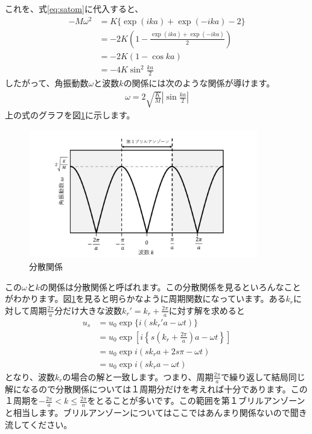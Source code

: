 \documentclass[10pt,b5paper,papersize,dvipdfmx]{jsbook}
\begin{document}
これを、式\ref{eq:satom}に代入すると、
\begin{align}
  -M\omega^2 &= K\{\exp(ika) + \exp(-ika) - 2\} \\
             &= -2K\left(1-\frac{\exp(ika) + \exp(-ika)}{2}\right) \\
             &= -2K(1-\cos ka)\\
             &= -4K\sin^2\frac{ka}{2}
\end{align}
したがって、角振動数$\omega$と波数$k$の関係には次のような関係が導けます。
\begin{align}
  \omega = 2 \sqrt{\frac{K}{M}} \left| \sin \frac{ka}{2}\right|
\end{align}
上の式のグラフを図\ref{fig:bunnsan}に示します。
\begin{figure}[htbp]
  \centering
  \includegraphics[width=10cm]{img/bunsann.pdf}  %
  \caption{分散関係}
  \label{fig:bunnsan}
\end{figure}
この$\omega$と$k$の関係は分散関係と呼ばれます。この分散関係を見るといろんなことがわかります。図\ref{fig:bunnsan}を見ると明らかなように周期関数になっています。ある$k_r$に対して周期$\frac{2\pi}{a}$分だけ大きな波数$k_r' = k_r + \frac{2\pi}{a}$に対す解を求めると
\begin{align}
  u_s &= u_0 \exp\{i(sk_r'a - \omega t)\}\\
      &= u_0 \exp \left[i\left\{s \left(k_r + \frac{2\pi}{a}\right)a-\omega t\right\}\right]\\
      & = u_0 \exp {i(sk_ra + 2s\pi - \omega t)}\\
      & = u_0 \exp {i(sk_ra -\omega t)}
\end{align}
となり、波数$k_r$の場合の解と一致します。つまり、周期$\frac{2\pi}{a}$で繰り返して結局同じ解になるので分散関係については１周期分だけを考えれば十分であります。この１周期を$-\frac{2\pi}{a} < k\leq \frac{2\pi}{a}$をとることが多いです。この範囲を第１ブリルアンゾーンと相当します。ブリルアンゾーンについてはここではあんまり関係ないので聞き流してください。\par
\end{document}
